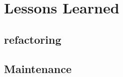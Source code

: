 \section{Lessons Learned}
\label{sec:lessons_learned}

\subsection{refactoring}

\subsection{Maintenance}